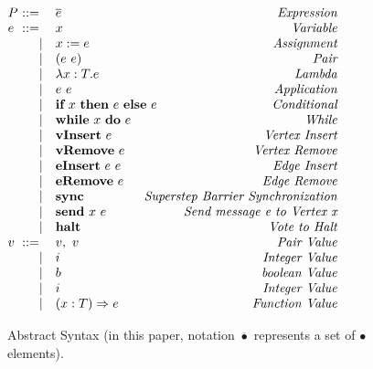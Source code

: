 \begin{figure}[t]
\begin{center}
$\begin{array}{@{}l@{~}l@{\quad}l@{\!\!\!\!\!\!}r}
P &  ::= & \overline e & \emph{Expression} \\

\newline
\newline


e &  ::= & x & \emph{Variable} \\
&\ \ \ \   \mid & x:=e & \emph{Assignment} \\
&\ \ \ \   \mid & (e~e) & \emph{Pair} \\
&\ \ \ \   \mid & \lambda x:T.e & \emph{Lambda} \\
&\ \ \ \   \mid & e~e & \emph{Application} \\
&\ \ \ \   \mid & \textbf{if}~x~\textbf{then}~e~\textbf{else}~e  & \emph{Conditional} \\
&\ \ \ \   \mid & \textbf{while}~x~\textbf{do}~e  & \emph{While} \\
&\ \ \ \   \mid & \textbf{vInsert}~e  & \emph{Vertex Insert} \\
&\ \ \ \   \mid & \textbf{vRemove}~e  & \emph{Vertex Remove} \\
&\ \ \ \   \mid & \textbf{eInsert}~e~e  & \emph{Edge Insert} \\
&\ \ \ \   \mid & \textbf{eRemove}~e  & \emph{Edge Remove} \\
&\ \ \ \   \mid & \textbf{sync} & \emph{Superstep Barrier Synchronization} \\
&\ \ \ \   \mid & \textbf{send}~x~e & \emph{Send message e to Vertex x} \\
&\ \ \ \   \mid & \textbf{halt} & \emph{Vote to Halt} \\


\newline
\newline


v &  ::= & v,~v  & \emph{Pair Value} \\
&\ \ \ \   \mid & i & \emph{Integer Value} \\
&\ \ \ \   \mid & b & \emph{boolean Value} \\
&\ \ \ \   \mid & i & \emph{Integer Value} \\
&\ \ \ \   \mid & (x:T) \Rightarrow e & \emph{Function Value} \\
\end{array}
$
\end{center}
\caption{Abstract Syntax (in this paper, notation
$\overline{\bullet}$ represents a set of $\bullet$ elements).}
\label{fig-syntax}
\end{figure}